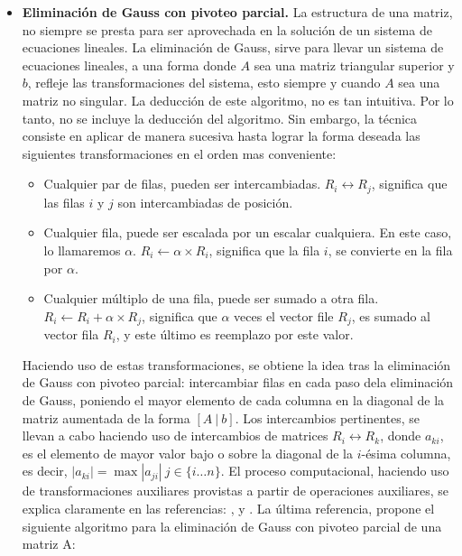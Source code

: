 \documentclass[11pt, spanish]{article}
\begin{document}
\begin{enumerate}
\begin{itemize}
\item \textbf{Eliminación de Gauss con pivoteo parcial.} La estructura de una matriz, no siempre se presta para ser aprovechada en la solución de un sistema de ecuaciones lineales. La eliminación de Gauss, sirve para llevar un sistema de ecuaciones lineales, a una forma donde $A$ sea una matriz triangular superior y $b$, refleje las transformaciones del sistema, esto siempre y cuando $A$ sea una matriz no singular. La deducción de este algoritmo, no es tan intuitiva. Por lo tanto, no se incluye la deducción del algoritmo. Sin embargo, la técnica consiste en aplicar de manera sucesiva hasta lograr la forma deseada las siguientes transformaciones en el orden mas conveniente:

\begin{itemize}
\item Cualquier par de filas, pueden ser intercambiadas. $R_i \longleftrightarrow R_j$, significa que las filas $i$ y $j$ son intercambiadas de posición.
\item Cualquier fila, puede ser escalada por un escalar cualquiera. En este caso, lo llamaremos $\alpha$. $R_i \longleftarrow \alpha \times R_i$, significa que la fila $i$, se convierte en la fila por $\alpha$.
\item Cualquier múltiplo de una fila, puede ser sumado a otra fila. $R_i \longleftarrow R_i + \alpha \times R_j$, significa que $\alpha$ veces el vector file $R_j$, es sumado al vector fila $R_i$, y este último es reemplazo por este valor.
\end{itemize}

Haciendo uso de estas transformaciones, se obtiene la idea tras la eliminación de Gauss con pivoteo parcial: intercambiar filas en cada paso dela eliminación de Gauss, poniendo el mayor elemento de cada columna en la diagonal de la matriz aumentada de la forma $[A\ |\ b]$. Los intercambios pertinentes, se llevan a cabo haciendo uso de intercambios de matrices $R_i \longleftrightarrow R_k$, donde $a_{ki}$, es el elemento de mayor valor bajo o sobre la diagonal de la $i$-ésima columna, es decir, $|a_{ki}| = \max{|a_{ji}|}\ j \in \{i \dots n\}$. El proceso computacional, haciendo uso de transformaciones auxiliares provistas a partir de operaciones auxiliares, se explica claramente en las referencias: \cite{datta1995numerical}, y \cite{golub2012matrixcomputations}. La última referencia, propone el siguiente algoritmo para la eliminación de Gauss con pivoteo parcial de una matriz A:

\begin{algorithm}[H]
 \
 

\end{algorithm}
\end{itemize}
\end{enumerate}
\end{document}

